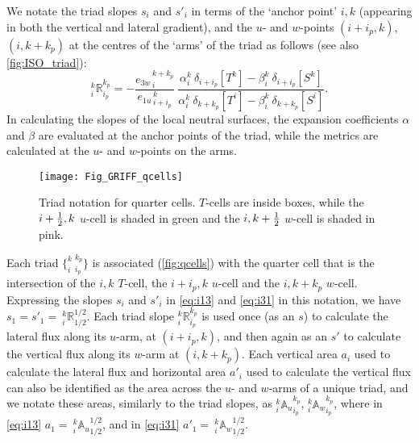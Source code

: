 \documentclass[../main/NEMO_manual]{subfiles}
\begin{document}
We notate the triad slopes $s_i$ and $s'_i$ in terms of the `anchor point' $i,k$
(appearing in both the vertical and lateral gradient),
and the $u$- and $w$-points $(i+i_p,k)$, $(i,k+k_p)$ at the centres of the `arms' of the triad as follows
(see also \autoref{fig:ISO_triad}):
\begin{equation}
  \label{eq:R}
  _i^k \mathbb{R}_{i_p}^{k_p}
  =-\frac{ {e_{3w}}_{\,i}^{\,k+k_p}} { {e_{1u}}_{\,i+i_p}^{\,k}}
  \
  \frac
  { \alpha_i^k  \ \delta_{i+i_p}[T^k] - \beta_i^k \ \delta_{i+i_p}[S^k] }
  { \alpha_i^k  \ \delta_{k+k_p}[T^i] - \beta_i^k \ \delta_{k+k_p}[S^i] }.
\end{equation}
In calculating the slopes of the local neutral surfaces,
the expansion coefficients $\alpha$ and $\beta$ are evaluated at the anchor points of the triad,
while the metrics are calculated at the $u$- and $w$-points on the arms.

\begin{figure}[tb]
  \begin{center}
    \texttt{[image: Fig\_GRIFF\_qcells]}
    \caption{
      \protect\label{fig:qcells}
      Triad notation for quarter cells. $T$-cells are inside boxes,
      while the  $i+\textstyle \frac{1}{2},k$ $u$-cell is shaded in green and
      the $i,k+\textstyle \frac{1}{2}$ $w$-cell is shaded in pink.
    }
  \end{center}
\end{figure}

Each triad $\{_i^{k}\:_{i_p}^{k_p}\}$ is associated (\autoref{fig:qcells}) with the quarter cell that is
the intersection of the $i,k$ $T$-cell, the $i+i_p,k$ $u$-cell and the $i,k+k_p$ $w$-cell.
Expressing the slopes $s_i$ and $s'_i$ in \autoref{eq:i13} and \autoref{eq:i31} in this notation,
we have \eg \ $s_1=s'_1={\:}_i^k \mathbb{R}_{1/2}^{1/2}$.
Each triad slope $_i^k\mathbb{R}_{i_p}^{k_p}$ is used once (as an $s$) to
calculate the lateral flux along its $u$-arm, at $(i+i_p,k)$,
and then again as an $s'$ to calculate the vertical flux along its $w$-arm at $(i,k+k_p)$.
Each vertical area $a_i$ used to calculate the lateral flux and horizontal area $a'_i$ used to
calculate the vertical flux can also be identified as the area across the $u$- and $w$-arms of a unique triad,
and we notate these areas, similarly to the triad slopes,
as $_i^k{\mathbb{A}_u}_{i_p}^{k_p}$, $_i^k{\mathbb{A}_w}_{i_p}^{k_p}$,
where \eg in \autoref{eq:i13} $a_{1}={\:}_i^k{\mathbb{A}_u}_{1/2}^{1/2}$,
and in \autoref{eq:i31} $a'_{1}={\:}_i^k{\mathbb{A}_w}_{1/2}^{1/2}$.
\end{document}
